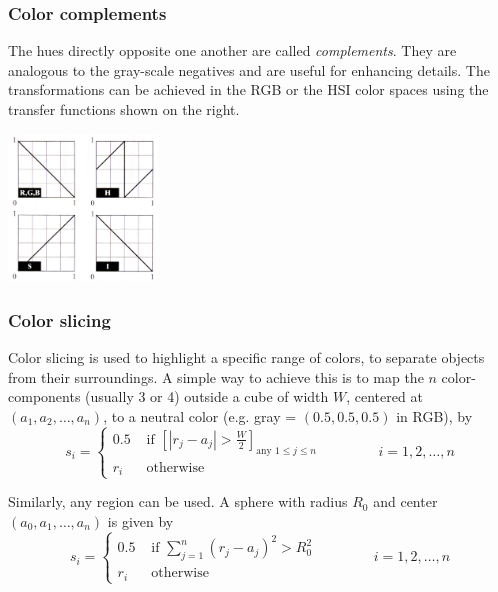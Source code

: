 \subsubsection{Color complements }
\begin{minipage}{12cm}
	The hues directly opposite one another are called \textit{complements}. They are analogous to the gray-scale negatives and are useful for enhancing details. The transformations can be achieved in the RGB or the HSI color spaces using the transfer functions shown on the right.
\end{minipage}
\begin{minipage}{6cm}
	\centering
	\includegraphics[width=4cm]{images/ColorComplements.jpeg}
\end{minipage}

\subsubsection{Color slicing }
Color slicing is used to highlight a specific range of colors, to separate objects from their surroundings. A simple way to achieve this is to map the $n$ color-components (usually 3 or 4) outside a cube of width $W$, centered at $(a_1,a_2,\dots,a_n)$, to a neutral color (e.g. gray = $(0.5,0.5,0.5)$ in RGB), by
\begin{equation}
	s_i = \begin{cases}
		0.5 & \text{  if } \left[ \left| r_j - a_j \right| > \frac{W}{2} \right]_{\text{any } 1 \leq j \leq n} \\
		r_i & \text{  otherwise}
	\end{cases} \qquad \qquad i = 1,2,\dots,n
\end{equation}

Similarly, any region can be used. A sphere with radius $R_0$ and center $(a_0,a_1,\dots,a_n)$ is given by
\begin{equation}
	s_i = \begin{cases}
		0.5 & \text{  if } \sum_{j=1}^{n} (r_j - a_j)^2 > R_0^2 \\
		r_i & \text{  otherwise}
	\end{cases} \qquad \qquad i = 1,2,\dots,n
\end{equation}

